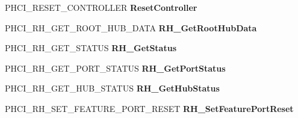 \begin{DoxyCompactItemize}
\item 
\mbox{\label{struct___u_s_b_p_o_r_t___r_e_g_i_s_t_r_a_t_i_o_n___p_a_c_k_e_t_a9a8e0e698b553a5204b7f7ba0b3ffe18}} 
P\+H\+C\+I\+\_\+\+R\+E\+S\+E\+T\+\_\+\+C\+O\+N\+T\+R\+O\+L\+L\+ER {\bfseries Reset\+Controller}
\item 
\mbox{\label{struct___u_s_b_p_o_r_t___r_e_g_i_s_t_r_a_t_i_o_n___p_a_c_k_e_t_a5bd8e590a03b8af60b95afa852a45426}} 
P\+H\+C\+I\+\_\+\+R\+H\+\_\+\+G\+E\+T\+\_\+\+R\+O\+O\+T\+\_\+\+H\+U\+B\+\_\+\+D\+A\+TA {\bfseries R\+H\+\_\+\+Get\+Root\+Hub\+Data}
\item 
\mbox{\label{struct___u_s_b_p_o_r_t___r_e_g_i_s_t_r_a_t_i_o_n___p_a_c_k_e_t_af944e341b5964f569f90f9fc373bc521}} 
P\+H\+C\+I\+\_\+\+R\+H\+\_\+\+G\+E\+T\+\_\+\+S\+T\+A\+T\+US {\bfseries R\+H\+\_\+\+Get\+Status}
\item 
\mbox{\label{struct___u_s_b_p_o_r_t___r_e_g_i_s_t_r_a_t_i_o_n___p_a_c_k_e_t_a6e4e8c4ecb2237ab309669841c30ec15}} 
P\+H\+C\+I\+\_\+\+R\+H\+\_\+\+G\+E\+T\+\_\+\+P\+O\+R\+T\+\_\+\+S\+T\+A\+T\+US {\bfseries R\+H\+\_\+\+Get\+Port\+Status}
\item 
\mbox{\label{struct___u_s_b_p_o_r_t___r_e_g_i_s_t_r_a_t_i_o_n___p_a_c_k_e_t_a1a26b6bd6643687ebf114c014eaee0e5}} 
P\+H\+C\+I\+\_\+\+R\+H\+\_\+\+G\+E\+T\+\_\+\+H\+U\+B\+\_\+\+S\+T\+A\+T\+US {\bfseries R\+H\+\_\+\+Get\+Hub\+Status}
\item 
\mbox{\label{struct___u_s_b_p_o_r_t___r_e_g_i_s_t_r_a_t_i_o_n___p_a_c_k_e_t_ad061a4ea0224a0191877fdb8f3e6a93f}} 
P\+H\+C\+I\+\_\+\+R\+H\+\_\+\+S\+E\+T\+\_\+\+F\+E\+A\+T\+U\+R\+E\+\_\+\+P\+O\+R\+T\+\_\+\+R\+E\+S\+ET {\bfseries R\+H\+\_\+\+Set\+Feature\+Port\+Reset}
\item 
\mbox{\label{struct___u_s_b_p_o_r_t___r_e_g_i_s_t_r_a_t_i_o_n___p_a_c_k_e_t_aee5f7b72bcf6f29d6db15f3b1aeda34c}} 

\end{DoxyCompactItemize}
